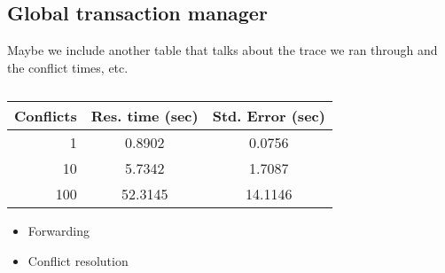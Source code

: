 

\subsection{Global transaction manager}
Maybe we include another table that talks about the trace we ran through and the conflict times, etc.

\begin{table}
\label{tab:conflicttimes}
\begin{center}
  \begin{tabular}{| r | c  c | }
    \hline
    {\bf Conflicts } & {\bf Res. time (sec) } & {\bf Std. Error (sec)} \\ \hline
    1 & 0.8902 & 0.0756 \\ \hline
    10 & 5.7342 & 1.7087 \\ \hline
    100 & 52.3145 & 14.1146 \\ 
    \hline
  \end{tabular}
\caption{}
\end{center}
\end{table}


\begin{itemize}
\item Forwarding
\item Conflict resolution
\end{itemize}










